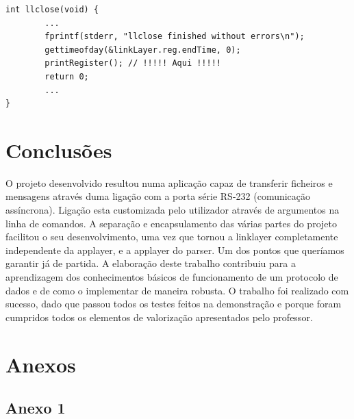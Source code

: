 \documentclass[a4paper]{article}
\begin{document}
\begin{verbatim}
int llclose(void) {
        ...
        fprintf(stderr, "llclose finished without errors\n");
        gettimeofday(&linkLayer.reg.endTime, 0);
        printRegister(); // !!!!! Aqui !!!!!
        return 0;
        ...
}
\end{verbatim}

\section{Conclusões}
O projeto desenvolvido resultou numa aplicação capaz de transferir ficheiros e
mensagens através duma ligação com a porta série RS-232 (comunicação
assíncrona). Ligação esta customizada pelo utilizador através de argumentos na
linha de comandos. A separação e encapsulamento das várias partes do projeto
facilitou o seu desenvolvimento, uma vez que tornou a linklayer completamente
independente da applayer, e a applayer do
parser. Um dos pontos que queríamos garantir já de partida. A elaboração deste
trabalho contribuiu para a aprendizagem dos conhecimentos básicos de
funcionamento de um protocolo de dados e de como o implementar de maneira
robusta. O trabalho foi realizado com sucesso, dado que passou todos os
testes feitos na demonstração e porque foram cumpridos todos os elementos de
valorização apresentados pelo professor.

\newpage
\section*{Anexos}
\subsection*{Anexo 1}
\end{document}

